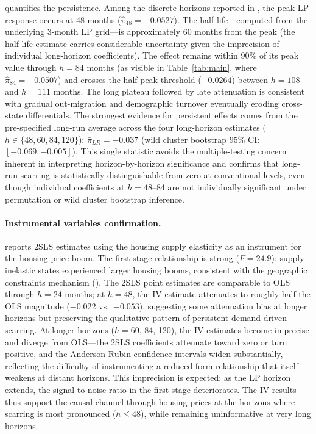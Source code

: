 \documentclass[12pt]{article}
\begin{document}
 quantifies the persistence. Among the discrete horizons reported in , the peak LP response occurs at 48 months ($\hat{\pi}_{48} = -0.0527$). The half-life---computed from the underlying 3-month LP grid---is approximately 60 months from the peak (the half-life estimate carries considerable uncertainty given the imprecision of individual long-horizon coefficients). The effect remains within 90\% of its peak value through $h = 84$ months (as visible in Table~\ref{tab:main}, where $\hat{\pi}_{84} = -0.0507$) and crosses the half-peak threshold ($-0.0264$) between $h = 108$ and $h = 111$ months. The long plateau followed by late attenuation is consistent with gradual out-migration and demographic turnover eventually eroding cross-state differentials. The strongest evidence for persistent effects comes from the pre-specified long-run average across the four long-horizon estimates ($h \in \{48, 60, 84, 120\}$): $\bar{\pi}_{LR} = -0.037$ (wild cluster bootstrap 95\% CI: $[-0.069, -0.005]$). This single statistic avoids the multiple-testing concern inherent in interpreting horizon-by-horizon significance and confirms that long-run scarring is statistically distinguishable from zero at conventional levels, even though individual coefficients at $h = 48$--84 are not individually significant under permutation or wild cluster bootstrap inference.

\paragraph{Instrumental variables confirmation.}  reports 2SLS estimates using the \citet{saiz2010geographic} housing supply elasticity as an instrument for the housing price boom. The first-stage relationship is strong ($F = 24.9$): supply-inelastic states experienced larger housing booms, consistent with the geographic constraints mechanism (). The 2SLS point estimates are comparable to OLS through $h = 24$ months; at $h = 48$, the IV estimate attenuates to roughly half the OLS magnitude ($-0.022$ vs.\ $-0.053$), suggesting some attenuation bias at longer horizons but preserving the qualitative pattern of persistent demand-driven scarring. At longer horizons ($h = 60$, 84, 120), the IV estimates become imprecise and diverge from OLS---the 2SLS coefficients attenuate toward zero or turn positive, and the Anderson-Rubin confidence intervals widen substantially, reflecting the difficulty of instrumenting a reduced-form relationship that itself weakens at distant horizons. This imprecision is expected: as the LP horizon extends, the signal-to-noise ratio in the first stage deteriorates. The IV results thus support the causal channel through housing prices at the horizons where scarring is most pronounced ($h \leq 48$), while remaining uninformative at very long horizons.
\end{document}
